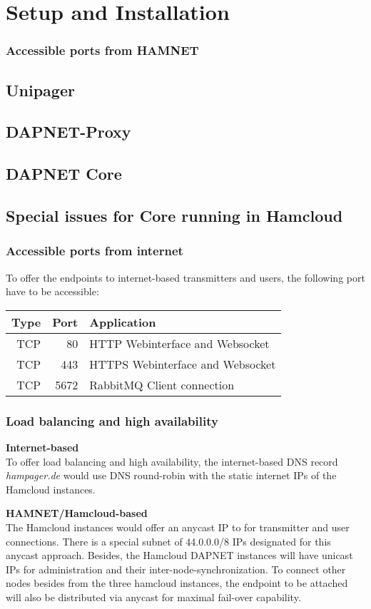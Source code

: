 \chapter{Setup and Installation}


\subsection{Accessible ports from HAMNET}

\section{Unipager}

\section{DAPNET-Proxy}

\section{DAPNET Core}

\section{Special issues for Core running in Hamcloud}

\subsection{Accessible ports from internet}
To offer the endpoints to internet-based transmitters and users, the following port have to be accessible:

\begin{tabular}{r|r|l}
Type & Port & Application\\
\hline
TCP & 80 & HTTP Webinterface and Websocket\\
TCP & 443 & HTTPS Webinterface  and Websocket\\
TCP & 5672 & RabbitMQ Client connection\\
\end{tabular}

\subsection{Load balancing and high availability}
\textbf{Internet-based}\\
To offer load balancing and high availability, the internet-based DNS record \textit{hampager.de} would use DNS round-robin with the static internet IPs of the Hamcloud instances.

\textbf{HAMNET/Hamcloud-based}\\
The Hamcloud instances would offer an anycast IP to for transmitter and user connections. There is a special subnet of 44.0.0.0/8 IPs designated for this anycast approach. Besides, the Hamcloud DAPNET instances will have unicast IPs for administration and their inter-node-synchronization.
To connect other nodes besides from the three hamcloud instances, the endpoint to be attached will also be distributed via anycast for maximal fail-over capability.




